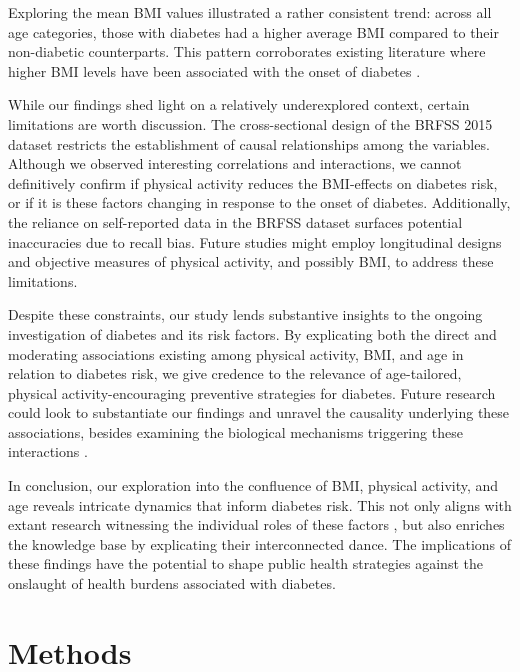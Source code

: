\documentclass[11pt]{article}
\begin{document}
Exploring the mean BMI values illustrated a rather consistent trend: across all age categories, those with diabetes had a higher average BMI compared to their non-diabetic counterparts. This pattern corroborates existing literature where higher BMI levels have been associated with the onset of diabetes \cite{Singh2013TheAQ, Chan1994ObesityFD}.

While our findings shed light on a relatively underexplored context, certain limitations are worth discussion. The cross-sectional design of the BRFSS 2015 dataset restricts the establishment of causal relationships among the variables. Although we observed interesting correlations and interactions, we cannot definitively confirm if physical activity reduces the BMI-effects on diabetes risk, or if it is these factors changing in response to the onset of diabetes. Additionally, the reliance on self-reported data in the BRFSS dataset surfaces potential inaccuracies due to recall bias. Future studies might employ longitudinal designs and objective measures of physical activity, and possibly BMI, to address these limitations.

Despite these constraints, our study lends substantive insights to the ongoing investigation of diabetes and its risk factors. By explicating both the direct and moderating associations existing among physical activity, BMI, and age in relation to diabetes risk, we give credence to the relevance of age-tailored, physical activity-encouraging preventive strategies for diabetes. Future research could look to substantiate our findings and unravel the causality underlying these associations, besides examining the biological mechanisms triggering these interactions \cite{Chen2022CausalRB}.

In conclusion, our exploration into the confluence of BMI, physical activity, and age reveals intricate dynamics that inform diabetes risk. This not only aligns with extant research witnessing the individual roles of these factors \cite{Astrup2001HealthyLI, Wing2011BenefitsOM, Bohn2015ImpactOP}, but also enriches the knowledge base by explicating their interconnected dance. The implications of these findings have the potential to shape public health strategies against the onslaught of health burdens associated with diabetes.

\section*{Methods}
\end{document}

